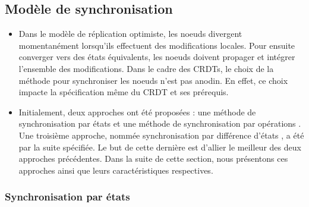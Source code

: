 \documentclass[12pt]{thesul}
\begin{document}
\subsection{Modèle de synchronisation}

\begin{itemize}
  \item Dans le modèle de réplication optimiste, les noeuds divergent momentanément lorsqu'ils effectuent des modifications locales.
    Pour ensuite converger vers des états équivalents, les noeuds doivent propager et intégrer l'ensemble des modifications.
    Dans le cadre des \acp{CRDT}, le choix de la méthode pour synchroniser les noeuds n'est pas anodin.
    En effet, ce choix impacte la spécification même du \ac{CRDT} et ses prérequis.
  \item Initialement, deux approches ont été proposées : une méthode de synchronisation par états \cite{shapiro_2011_crdt, shapiro:inria-00555588} et une méthode de synchronisation par opérations \cite{shapiro_2011_crdt, shapiro:inria-00555588, 2014-making-op-based-crdts-op-based, baquero2017pure}.
    Une troisième approche, nommée synchronisation par différence d'états \cite{almeida2015delta, Almeida_2018}, a été par la suite spécifiée.
    Le but de cette dernière est d'allier le meilleur des deux approches précédentes.
    Dans la suite de cette section, nous présentons ces approches ainsi que leurs caractéristiques respectives.
\end{itemize}

\subsubsection{Synchronisation par états}
\end{document}
